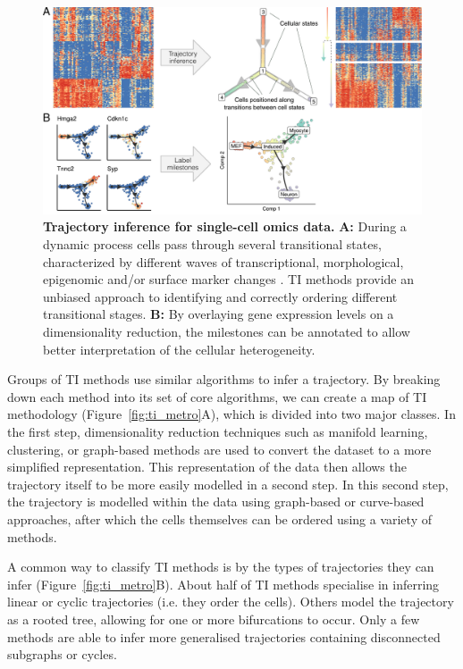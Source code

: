 \begin{figure}[htb!]
	\centering
	\includegraphics[width=.9\linewidth]{fig/comptools2/comptool_3_trajectoryinference.pdf} 
	\caption{
		\textbf{Trajectory inference for single-cell omics data.}
		\textbf{A:} During a dynamic process cells pass through several transitional states, characterized by different waves of transcriptional, morphological, epigenomic and/or surface marker changes \cite{enver_stemcellstates_2009}. TI methods provide an unbiased approach to identifying and correctly ordering different transitional stages. 
		\textbf{B:} By overlaying gene expression levels on a dimensionality reduction, the milestones can be annotated to allow better interpretation of the cellular heterogeneity.
	}
	\label{fig:comp_tools_ti}
\end{figure}

Groups of TI methods use similar algorithms to infer a trajectory. By breaking down each method into its set of core algorithms, we can create a map of TI methodology \cite{cannoodt_computationalmethodstrajectory_2016} (Figure~\ref{fig:ti_metro}A), which is divided into two major classes.
In the first step, dimensionality reduction techniques such as manifold learning, clustering, or graph-based methods are used to convert the dataset to a more simplified representation. This representation of the data then allows the trajectory itself to be more easily modelled in a second step. In this second step, the trajectory is modelled within the data using graph-based or curve-based approaches, after which the cells themselves can be ordered using a variety of methods.

A common way to classify TI methods is by the types of trajectories they can infer \cite{saelens_comparisonsinglecelltrajectory_2019} (Figure~\ref{fig:ti_metro}B). About half of TI methods specialise in inferring linear or cyclic trajectories (i.e. they order the cells). Others model the trajectory as a rooted tree, allowing for one or more bifurcations to occur. Only a few methods are able to infer more generalised trajectories containing disconnected subgraphs or cycles.

